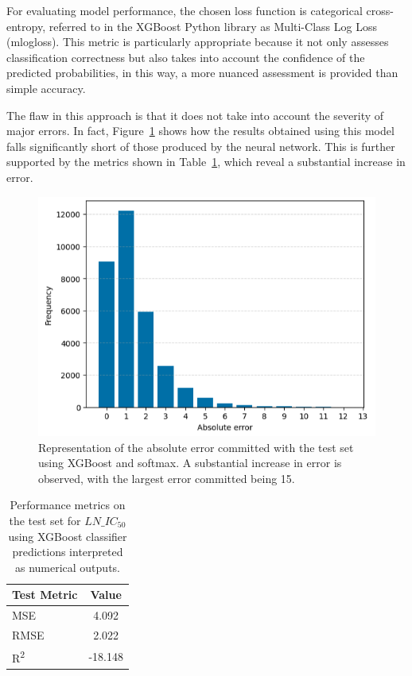 For evaluating model performance, the chosen loss function is categorical cross-entropy, referred to in the XGBoost Python library as Multi-Class Log Loss (mlogloss). This metric is particularly appropriate because it not only assesses classification correctness but also takes into account the confidence of the predicted probabilities, in this way, a more nuanced assessment is provided than simple accuracy.

The flaw in this approach is that it does not take into account the severity of major errors. In fact, Figure~\ref{fig:barplot_xgboost_v1} shows how the results obtained using this model falls significantly short of those produced by the neural network. This is further supported by the metrics shown in Table~\ref{tab:xgboost_classification_metrics_v1}, which reveal a substantial increase in error.

\begin{figure}[H]
    \centering
    \includegraphics[width=1\textwidth]{figures/xgboost_class/xgboost_class_v1_softmax.png}
    \caption{Representation of the absolute error committed with the test set using XGBoost and softmax. A substantial increase in error is observed, with the largest error committed being 15.}
    \label{fig:barplot_xgboost_v1}
\end{figure}

\begin{table}[H]
    \centering
    \begin{tabular}{|l|c|}
    \hline
    \textbf{Test Metric} & \textbf{Value} \\
    \hline
    MSE & 4.092 \\
    RMSE & 2.022 \\
    R\textsuperscript{2} & -18.148 \\
    \hline
    \end{tabular}
    \caption{Performance metrics on the test set for \(LN\_IC_{50}\) using XGBoost classifier predictions interpreted as numerical outputs.}
    \label{tab:xgboost_classification_metrics_v1}
\end{table}

